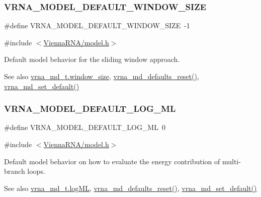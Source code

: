 \subsubsection{\texorpdfstring{VRNA\_MODEL\_DEFAULT\_WINDOW\_SIZE}{VRNA\_MODEL\_DEFAULT\_WINDOW\_SIZE}}
{\footnotesize\ttfamily \#define V\+R\+N\+A\+\_\+\+M\+O\+D\+E\+L\+\_\+\+D\+E\+F\+A\+U\+L\+T\+\_\+\+W\+I\+N\+D\+O\+W\+\_\+\+S\+I\+ZE~-\/1}



{\ttfamily \#include $<$\mbox{\hyperlink{model_8h}{Vienna\+R\+N\+A/model.\+h}}$>$}



Default model behavior for the sliding window approach. 

\begin{DoxySeeAlso}{See also}
\mbox{\hyperlink{group__model__details_abea42f9229f8d8d6bcbedef316315bfc}{vrna\+\_\+md\+\_\+t.\+window\+\_\+size}}, \mbox{\hyperlink{group__model__details_ga70834424cf804d149937de89f80ceb45}{vrna\+\_\+md\+\_\+defaults\+\_\+reset()}}, \mbox{\hyperlink{group__model__details_ga8ac6ff84936282436f822644bf841f66}{vrna\+\_\+md\+\_\+set\+\_\+default()}} 
\end{DoxySeeAlso}
\mbox{\label{group__model__details_ga938f68463e84fe060aa6502f428a517d}} 
\subsubsection{\texorpdfstring{VRNA\_MODEL\_DEFAULT\_LOG\_ML}{VRNA\_MODEL\_DEFAULT\_LOG\_ML}}
{\footnotesize\ttfamily \#define V\+R\+N\+A\+\_\+\+M\+O\+D\+E\+L\+\_\+\+D\+E\+F\+A\+U\+L\+T\+\_\+\+L\+O\+G\+\_\+\+ML~0}



{\ttfamily \#include $<$\mbox{\hyperlink{model_8h}{Vienna\+R\+N\+A/model.\+h}}$>$}



Default model behavior on how to evaluate the energy contribution of multi-\/branch loops. 

\begin{DoxySeeAlso}{See also}
\mbox{\hyperlink{group__model__details_ae259f89a94acae0c7f1412603e7f57b5}{vrna\+\_\+md\+\_\+t.\+log\+ML}}, \mbox{\hyperlink{group__model__details_ga70834424cf804d149937de89f80ceb45}{vrna\+\_\+md\+\_\+defaults\+\_\+reset()}}, \mbox{\hyperlink{group__model__details_ga8ac6ff84936282436f822644bf841f66}{vrna\+\_\+md\+\_\+set\+\_\+default()}} 
\end{DoxySeeAlso}
\mbox{\label{group__model__details_ga2a5bbfc1edf33077e39466d2d9807115}} 
